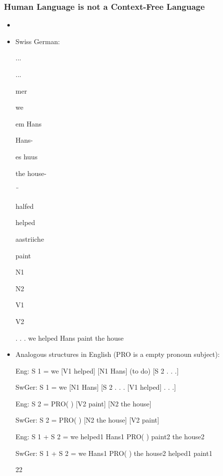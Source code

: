 \documentclass[compress,color=usenames]{beamer}
\begin{document}
\begin{frame}
\frametitle{Human Language is not a Context-Free Language}

\begin{itemize}
\item



\item Swiss German:


...


...





mer


we





em Hans


Hans-





es huus


the house-





¨


halfed


helped





aastriiche


paint





N1


N2


V1


V2


. . . we helped Hans paint the house


\item Analogous structures in English (PRO is a empty pronoun subject):


Eng: S 1 = we [V1 helped] [N1 Hans] (to do) [S 2 . . .]


SwGer: S 1 = we [N1 Hans] [S 2 . . . [V1 helped] . . .]


Eng: S 2 = PRO( ) [V2 paint] [N2 the house]


SwGer: S 2 = PRO( ) [N2 the house] [V2 paint]


Eng: S 1 + S 2 = we helped1 Hans1 PRO( ) paint2 the house2


SwGer: S 1 + S 2 = we Hans1 PRO( ) the house2 helped1 paint1


22




\end{itemize}

\end{frame}
\end{document}
